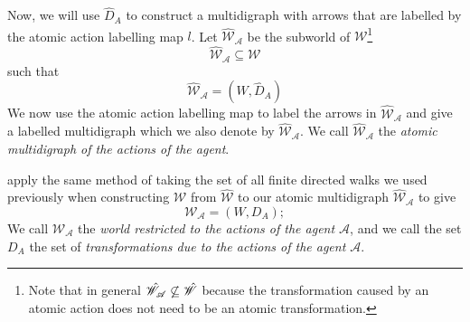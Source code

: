 Now, we will use $\hat{D}_{A}$ to construct a multidigraph with arrows that are labelled by the atomic action labelling map $l$.
Let $\hat{\mathscr{W}}_{\mathscr{A}}$ be the subworld of $\mathscr{W}$\footnote{
    Note that in general $\hat{\mathscr{W}}_{\mathscr{A}} \centernot\subseteq \hat{\mathscr{W}}$ because the transformation caused by an atomic action does not need to be an atomic transformation.
}
\begin{equation}
    \hat{\mathscr{W}}_{\mathscr{A}} \subseteq \mathscr{W}
\end{equation}
such that
\begin{equation}
    \hat{\mathscr{W}}_{\mathscr{A}} = (W, \hat{D}_{A})
\end{equation}
We now use the atomic action labelling map to label the arrows in $\hat{\mathscr{W}}_{\mathscr{A}}$ and give a labelled multidigraph which we also denote by $\hat{\mathscr{W}}_{\mathscr{A}}$.
We call $\hat{\mathscr{W}}_{\mathscr{A}}$ the \emph{atomic multidigraph of the actions of the agent}.

 apply the same method of taking the set of all finite directed walks we used previously when constructing $\mathscr{W}$ from $\hat{\mathscr{W}}$ to our atomic multidigraph $\hat{\mathscr{W}}_{\mathscr{A}}$ to give
\begin{equation}
    \mathscr{W}_{\mathscr{A}} = (W, D_{A});
\end{equation}
We call $\mathscr{W}_{\mathscr{A}}$ the \emph{world restricted to the actions of the agent $\mathscr{A}$}, and we call the set $D_{A}$ the set of \emph{transformations due to the actions of the agent $\mathscr{A}$}.

